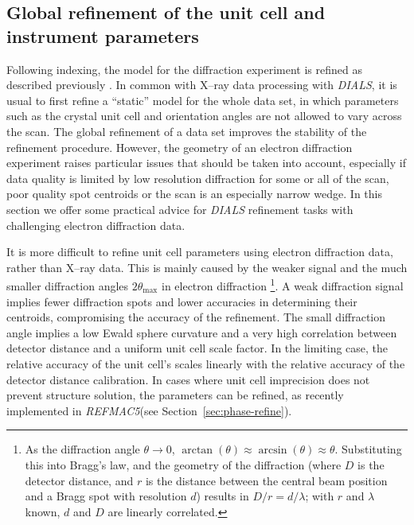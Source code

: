 \documentclass[preprint]{iucr}
\newcommand{\dials}{\emph{DIALS}\xspace}
\newcommand{\refmac}{\emph{REFMAC5}\xspace}
\begin{document}
\subsection{Global refinement of the unit cell and instrument parameters
\label{sec:refinement}}

Following indexing, the model for the diffraction experiment is refined as
described previously \cite{Waterman2016}. In common with X--ray data processing
with \dials, it is usual to first refine a ``static'' model for the whole data
set, in which parameters such as the crystal unit cell and orientation angles
are not allowed to vary across the scan. The global refinement of a data set
improves the stability of the refinement procedure. However, the geometry of an
electron diffraction experiment raises particular issues that should be taken
into account, especially if data quality is limited by low resolution
diffraction for some or all of the scan, poor quality spot centroids or the
scan is an especially narrow wedge. In this section we offer some practical
advice for \dials refinement tasks with challenging electron diffraction data.

It is more difficult to refine unit cell parameters using electron
diffraction data, rather than X--ray data. This is mainly caused by the weaker
signal and the much smaller diffraction angles $2\theta_\text{max}$ in electron diffraction
\footnote{As the diffraction angle $\theta \to 0$, $\arctan(\theta) \approx \arcsin(\theta)
\approx \theta$. Substituting this into Bragg's law, and the geometry of the diffraction (where
$D$ is the detector distance, and $r$ is the distance between the central beam position and a Bragg
spot with resolution $d$) results in $D/r = d/\lambda$; with $r$ and $\lambda$ known, $d$ and $D$ are
linearly correlated.}.
A weak diffraction signal implies fewer diffraction spots and lower accuracies in
determining their centroids, compromising the accuracy of the refinement. The small diffraction
angle implies a low Ewald sphere curvature and a very high correlation between detector
distance and a uniform unit cell scale factor. In the limiting case, the relative
accuracy of the unit cell’s scales linearly with the relative accuracy of the detector
distance calibration. In cases where unit cell imprecision does not prevent structure
solution, the parameters can be refined, as recently implemented in \refmac (see
Section~\ref{sec:phase-refine}).
\end{document}
